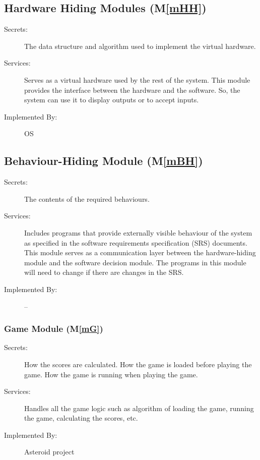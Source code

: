 \documentclass[12pt, titlepage]{article}
\newcommand{\mref}[1]{M\ref{#1}}
\begin{document}
\subsection{Hardware Hiding Modules (\mref{mHH})}

\begin{description}
\item[Secrets:]The data structure and algorithm used to implement the virtual
  hardware.
\item[Services:]Serves as a virtual hardware used by the rest of the
  system. This module provides the interface between the hardware and the
  software. So, the system can use it to display outputs or to accept inputs.
\item[Implemented By:] OS
\end{description}

\subsection{Behaviour-Hiding Module  (\mref{mBH})}

\begin{description}
\item[Secrets:]The contents of the required behaviours.
\item[Services:]Includes programs that provide externally visible behaviour of
  the system as specified in the software requirements specification (SRS)
  documents. This module serves as a communication layer between the
  hardware-hiding module and the software decision module. The programs in this
  module will need to change if there are changes in the SRS.
\item[Implemented By:] --
\end{description}

\subsubsection{Game Module (\mref{mG})}

\begin{description}
\item[Secrets:]How the scores are calculated. How the game is loaded before playing the game.  How the game is running when playing the game.
\item[Services:]Handles all the game logic such as algorithm of loading the game, running the game, calculating the scores, etc.
\item[Implemented By:] Asteroid project
\end{description}
\end{document}
